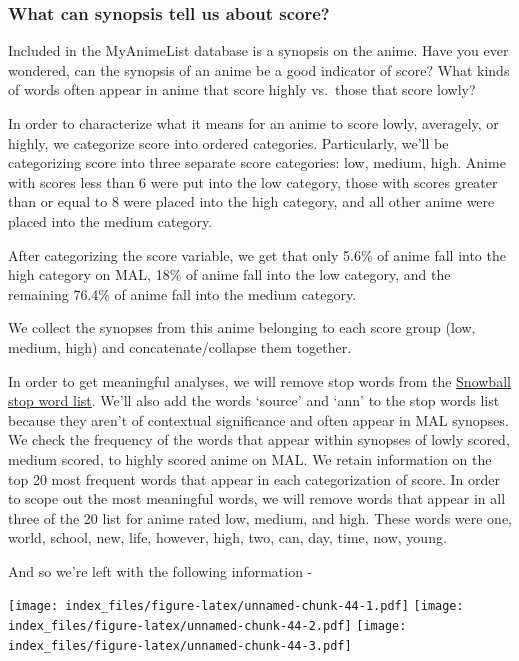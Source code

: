 \documentclass[
]{article}
\begin{document}
\hypertarget{what-can-synopsis-tell-us-about-score}{%
\subsubsection{What can synopsis tell us about
score?}\label{what-can-synopsis-tell-us-about-score}}

Included in the MyAnimeList database is a synopsis on the anime. Have
you ever wondered, can the synopsis of an anime be a good indicator of
score? What kinds of words often appear in anime that score highly
vs.~those that score lowly?

In order to characterize what it means for an anime to score lowly,
averagely, or highly, we categorize score into ordered categories.
Particularly, we'll be categorizing score into three separate score
categories: low, medium, high. Anime with scores less than 6 were put
into the low category, those with scores greater than or equal to 8 were
placed into the high category, and all other anime were placed into the
medium category.

After categorizing the score variable, we get that only 5.6\% of anime
fall into the high category on MAL, 18\% of anime fall into the low
category, and the remaining 76.4\% of anime fall into the medium
category.

We collect the synopses from this anime belonging to each score group
(low, medium, high) and concatenate/collapse them together.

In order to get meaningful analyses, we will remove stop words from the
\href{http://snowball.tartarus.org/algorithms/english/stop.txt}{Snowball
stop word list}. We'll also add the words `source' and `ann' to the stop
words list because they aren't of contextual significance and often
appear in MAL synopses. We check the frequency of the words that appear
within synopses of lowly scored, medium scored, to highly scored anime
on MAL. We retain information on the top 20 most frequent words that
appear in each categorization of score. In order to scope out the most
meaningful words, we will remove words that appear in all three of the
20 list for anime rated low, medium, and high. These words were one,
world, school, new, life, however, high, two, can, day, time, now,
young.

And so we're left with the following information -

\texttt{[image: index\_files/figure-latex/unnamed-chunk-44-1.pdf]}
\texttt{[image: index\_files/figure-latex/unnamed-chunk-44-2.pdf]}
\texttt{[image: index\_files/figure-latex/unnamed-chunk-44-3.pdf]}
\end{document}
